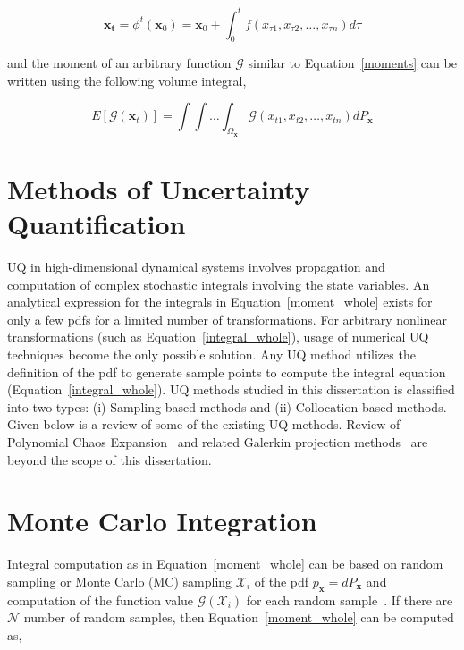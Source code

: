 \begin{equation}
\label{integral_whole}
\mathbf{x_{t}} =  \phi^t(\mathbf{x}_0) = \mathbf{x}_0 + \int_0^t f(x_{\tau 1},x_{\tau 2},\ldots,x_{\tau n}) d \tau
\end{equation}

\noindent and the moment of an arbitrary function $\mathcal{G}$ similar to Equation~\ref{moments} can be written using the following volume integral,

\begin{equation}
\label{moment_whole}
E[\mathcal{G}(\textbf{x}_t)] = \int \int \ldots \int_{\Omega_{\textbf{x}}} \mathcal{G}(x_{t1},x_{t2},\ldots,x_{tn}) dP_{\textbf{x}}
\end{equation}


\section{Methods of Uncertainty Quantification}

UQ in high-dimensional dynamical systems involves propagation and computation of complex stochastic integrals involving the state variables. An analytical expression for the integrals in Equation~\ref{moment_whole} exists for only a few pdfs for a limited number of transformations. For arbitrary nonlinear transformations (such as Equation~\ref{integral_whole}), usage of numerical UQ techniques become the only possible solution. Any UQ method utilizes the definition of the pdf to generate sample points to compute the integral equation (Equation~\ref{integral_whole}). UQ methods studied in this dissertation is classified into two types: (i) Sampling-based methods and (ii) Collocation based methods. Given below is a review of some of the existing UQ methods. Review of Polynomial Chaos Expansion~\cite{xiu2002wiener} and related Galerkin projection methods~\cite{fletcher1984computational} are beyond the scope of this dissertation. 


\section{Monte Carlo Integration}

Integral computation as in Equation~\ref{moment_whole} can be based on random sampling or Monte Carlo (MC) sampling $\mathcal{X}_i$ of the pdf $p_\textbf{x} = dP_\textbf{x}$ and computation of the function value $\mathcal{G}(\mathcal{X}_i)$ for each random sample~\cite{fishman1996monte}. If there are $\mathcal{N}$ number of random samples, then Equation~\ref{moment_whole} can be computed as,

